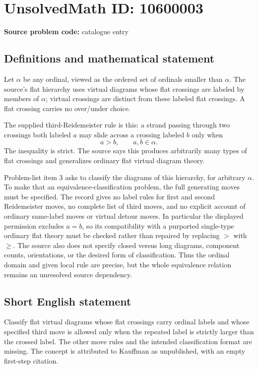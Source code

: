 \documentclass[11pt]{article}
\begin{document}
\section*{UnsolvedMath ID: 10600003}
\textbf{Source problem code:} catalogue entry
\subsection{Definitions and mathematical statement}
Let \(\alpha\) be any ordinal, viewed as the ordered set of ordinals smaller than \(\alpha\). The source's flat hierarchy uses virtual diagrams whose flat crossings are labeled by members of \(\alpha\); virtual crossings are distinct from these labeled flat crossings. A flat crossing carries no over/under choice.

The supplied third-Reidemeister rule is this: a strand passing through two crossings both labeled \(a\) may slide across a crossing labeled \(b\) only when
\[
 a>b,\qquad a,b\in\alpha.
\]
The inequality is strict. The source says this produces arbitrarily many types of flat crossings and generalizes ordinary flat virtual diagram theory.

Problem-list item 3 asks to classify the diagrams of this hierarchy, for arbitrary \(\alpha\). To make that an equivalence-classification problem, the full generating moves must be specified. The record gives no label rules for first and second Reidemeister moves, no complete list of third moves, and no explicit account of ordinary same-label moves or virtual detour moves. In particular the displayed permission excludes \(a=b\), so its compatibility with a purported single-type ordinary flat theory must be checked rather than repaired by replacing \(>\) with \(\ge\). The source also does not specify closed versus long diagrams, component counts, orientations, or the desired form of classification. Thus the ordinal domain and given local rule are precise, but the whole equivalence relation remains an unresolved source dependency.
\subsection{Short English statement}
Classify flat virtual diagrams whose flat crossings carry ordinal labels and whose specified third move is allowed only when the repeated label is strictly larger than the crossed label. The other move rules and the intended classification format are missing. The concept is attributed to Kauffman as unpublished, with an empty first-step citation.
\end{document}

